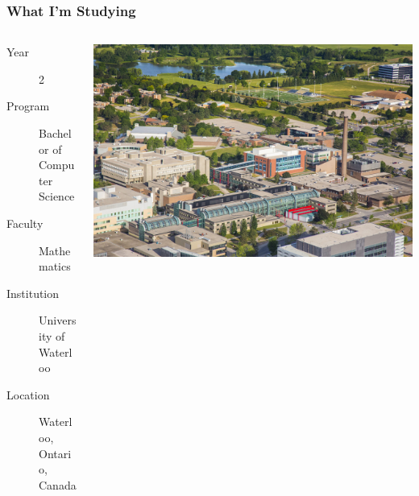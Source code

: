 \documentclass[mathserif]{beamer}
\begin{document}
\begin{frame}

\frametitle{What I'm Studying}

\begin{columns}[l]
\begin{column}{.7\textwidth}
\begin{description}
\item[Year] 2
\item[Program] Bachelor of Computer Science
\item[Faculty] Mathematics
\item[Institution] University of Waterloo
\item[Location] Waterloo, Ontario, Canada
\end{description}
\end{column}
\begin{column}{.3\textwidth}
\includegraphics[width=1.0\linewidth]{images/campus.jpg}
\end{column}
\end{columns}

\end{frame}

\end{document}
